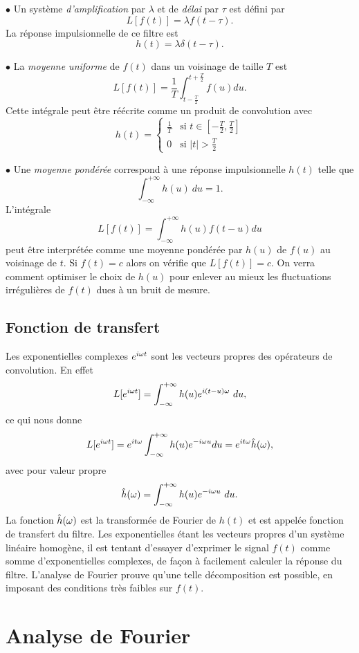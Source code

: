 $\bullet$ Un syst\`eme 
{\it d'amplification} par $\lambda$ et de {\it d\'elai}
par $\tau$ est d\'efini par
\[
L[f(t)] = \lambda f(t - \tau) .
\]
La r\'eponse impulsionnelle de ce filtre est 
\[
h(t) = \lambda \delta(t - \tau) .
\]

$\bullet$ La {\it moyenne uniforme} de $f(t)$ dans un voisinage de 
taille $T$ est 
\[
L[f(t)] = \frac 1 T \int_{t-\frac T 2}^{t+\frac T 2} f( u ) d u .
\]
Cette int\'egrale peut \^etre r\'e\'ecrite comme un produit de 
convolution avec 
\[
h(t) = \left\{ 
\begin{array}{ll}
 \frac 1 T & \mbox{si $t \in [-\frac T 2 , \frac T 2 ]$} \\
 0 & \mbox{si $|t| > \frac T 2$}
\end{array}
\right.
\]

$\bullet$ 
Une {\it moyenne pond\'er\'ee} correspond \`a une
r\'eponse impulsionnelle $h(t)$ telle que
\[
\int_{- \infty} ^{+ \infty} h(u) ~d u = 1 .
\]
L'int\'egrale
\[
L[f(t)] = \int_{-\infty}^{+\infty} h (u) f(t-u) du 
\]
peut \^etre interpr\'et\'ee comme une moyenne pond\'er\'ee par $h(u)$
de $f(u)$ au voisinage de $t$. Si
$f(t) = c$ alors on v\'erifie que $L[f(t)] = c$. On verra
comment optimiser
le choix de $h(u)$ pour enlever au mieux les fluctuations 
irr\'eguli\`eres de $f(t)$ dues \`a un bruit de mesure.

\subsection{Fonction de transfert}

Les exponentielles complexes $e^{i {\omega} t}$
sont les vecteurs propres des op\'erateurs de convolution.
En effet
\[
L[e^{i {\omega} t}] = 
\int_{- \infty} ^ {+ \infty}  h ( u ) e^{i (t-u) {\omega}}~d u ,
\]
ce qui nous donne
\[
L[e^{i {\omega} t}] = 
e ^ {i t {\omega}} \int_{- \infty} ^ {+ \infty}  h ( u ) 
e^{-i {\omega} u}d u = 
e ^ {i t {\omega}} \hat h ( {\omega} ),
\]
avec pour valeur propre
\[
\hat h ( {\omega} ) = \int_{- \infty} ^ {+ \infty}  h ( u ) 
e^{-i {\omega} u }~d u .
\]
La fonction $\hat h({\omega})$ est la transform\'ee de Fourier
de $h(t)$ et est appel\'ee fonction de transfert
du filtre.
Les exponentielles \'etant les vecteurs propres d'un syst\`eme
lin\'eaire homog\`ene, il est tentant d'essayer d'exprimer le
signal $f(t)$ comme somme d'exponentielles complexes,
de fa\c{c}on \`a facilement calculer la r\'eponse du filtre.
L'analyse de Fourier prouve qu'une telle d\'ecomposition est
possible, en imposant des conditions tr\`es faibles sur $f(t)$.

\section{Analyse de Fourier}


